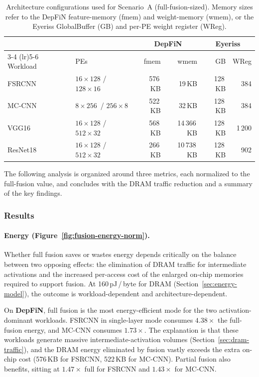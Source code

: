 \begin{table}[htbp]
  \centering
  \caption{Architecture configurations used for Scenario~A
    (full-fusion-sized).
    Memory sizes refer to the DepFiN feature-memory (fmem) and
    weight-memory (wmem), or the Eyeriss GlobalBuffer (GB) and
    per-PE weight register (WReg).}
  \label{tab:fusion-auto-configs}
  \begin{tabular}{ll rr rr}
    \toprule
    & & \multicolumn{2}{c}{DepFiN} & \multicolumn{2}{c}{Eyeriss} \\
    \cmidrule(lr){3-4} \cmidrule(lr){5-6}
    Workload & PEs
      & fmem & wmem
      & GB & WReg \\
    \midrule
    FSRCNN   & $16 \times 128$ / $128 \times 16$
      & 576\,KB  & 19\,KB
      & 128\,KB  & 384 \\
    MC-CNN   & $8 \times 256$\, / $256 \times 8$
      & 522\,KB  & 32\,KB
      & 128\,KB  & 384 \\
    VGG16    & $16 \times 128$ / $512 \times 32$
      & 568\,KB  & 14\,366\,KB
      & 128\,KB  & 1\,200 \\
    ResNet18 & $16 \times 128$ / $512 \times 32$
      & 266\,KB  & 10\,738\,KB
      & 128\,KB  & 902 \\
    \bottomrule
  \end{tabular}
\end{table}

The following analysis is organized around three metrics, each
normalized to the full-fusion value, and concludes with the
DRAM traffic reduction and a summary of the key findings.

\subsubsection{Results}

\paragraph{Energy (Figure~\ref{fig:fusion-energy-norm}).}
Whether full fusion saves or wastes energy depends critically on
the balance between two opposing effects: the elimination of DRAM
traffic for intermediate activations and the increased per-access
cost of the enlarged on-chip memories required to support fusion.
At 160\,pJ\,/\,byte for DRAM
(Section~\ref{sec:energy-model}), the outcome is
workload-dependent and architecture-dependent.


On \textbf{DepFiN}, full fusion is the most energy-efficient mode
for the two activation-dominant workloads.
FSRCNN in single-layer mode consumes $4.38\times$ the full-fusion
energy, and MC-CNN consumes $1.73\times$.
The explanation is that these workloads generate massive
intermediate-activation volumes (Section~\ref{sec:dram-traffic}),
and the DRAM energy eliminated by fusion
vastly exceeds the extra on-chip cost (576\,KB for FSRCNN, 522\,KB for MC-CNN).
Partial fusion also benefits, sitting at $1.47\times$ full for
FSRCNN and $1.43\times$ for MC-CNN.

